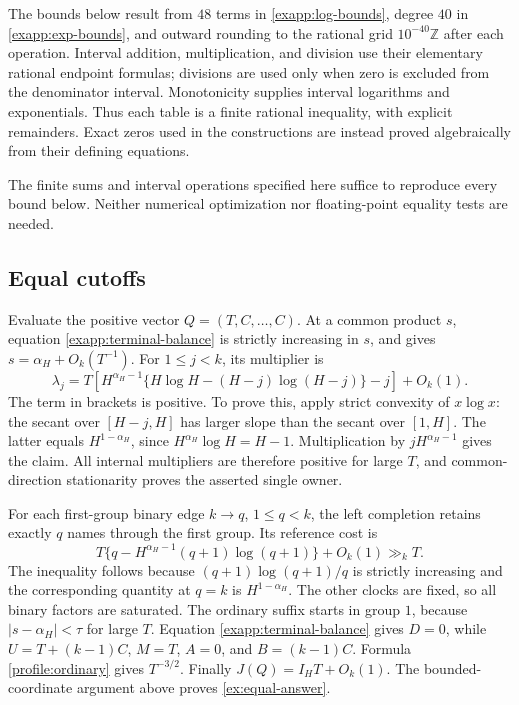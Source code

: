 The bounds below result from \(48\) terms in
\eqref{exapp:log-bounds}, degree \(40\) in
\eqref{exapp:exp-bounds}, and outward rounding to the rational grid
\(10^{-40}\mathbb Z\) after each operation.  Interval addition,
multiplication, and division use their elementary rational endpoint
formulas; divisions are used only when zero is excluded from the
denominator interval.  Monotonicity supplies interval logarithms and
exponentials.  Thus each table is a finite rational inequality, with
explicit remainders.  Exact zeros used in the constructions are instead
proved algebraically from their defining equations.

The finite sums and interval operations specified here suffice to
reproduce every bound below.  Neither numerical optimization nor
floating-point equality tests are needed.

\subsection{Equal cutoffs}

Evaluate the positive vector \(Q=(T,C,\ldots,C)\).  At a common
product \(s\), equation \eqref{exapp:terminal-balance} is strictly
increasing in \(s\), and gives
\(s=\alpha_H+O_k(T^{-1})\).  For \(1\le j<k\), its multiplier is
\begin{equation}
 \lambda_j=T\left[
 H^{\alpha_H-1}\{H\log H-(H-j)\log(H-j)\}-j\right]+O_k(1).
 \label{exapp:equal-KKT}
\end{equation}
The term in brackets is positive.  To prove this, apply strict
convexity of \(x\log x\): the secant over \([H-j,H]\) has larger
slope than the secant over \([1,H]\).  The latter equals
\(H^{1-\alpha_H}\), since
\(H^{\alpha_H}\log H=H-1\).  Multiplication by
\(jH^{\alpha_H-1}\) gives the claim.  All internal multipliers are
therefore positive for large \(T\), and common-direction stationarity
proves the asserted single owner.

For each first-group binary edge \(k\to q\), \(1\le q<k\), the left
completion retains exactly \(q\) names through the first group.  Its
reference cost is
\[
 T\{q-H^{\alpha_H-1}(q+1)\log(q+1)\}+O_k(1)\gg_k T.
\]
The inequality follows because \((q+1)\log(q+1)/q\) is strictly
increasing and the corresponding quantity at \(q=k\) is
\(H^{1-\alpha_H}\).  The other clocks are fixed, so all binary
factors are saturated.  The ordinary suffix starts in group \(1\),
because \(|s-\alpha_H|<\tau\) for large \(T\).  Equation
\eqref{exapp:terminal-balance} gives \(D=0\), while
\(U=T+(k-1)C\), \(M=T\), \(A=0\), and \(B=(k-1)C\).
Formula \eqref{profile:ordinary} gives \(T^{-3/2}\).
Finally \(J(Q)=I_HT+O_k(1)\).  The bounded-coordinate argument above
proves \eqref{ex:equal-answer}.

